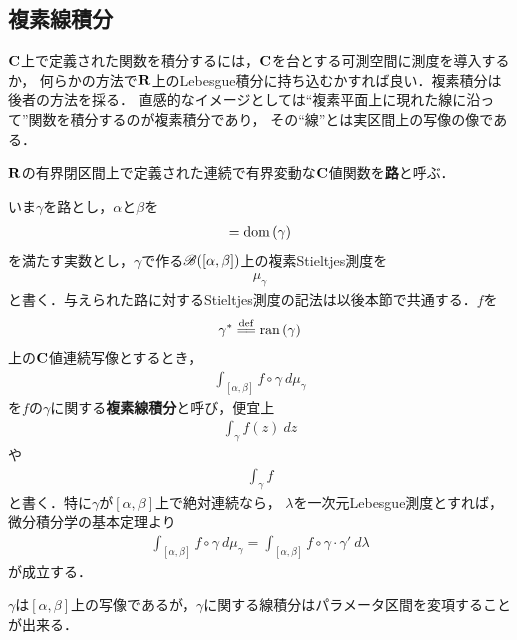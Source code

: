 \subsection{複素線積分}
	
	$\mathbf{C}$上で定義された関数を積分するには，$\mathbf{C}$を台とする可測空間に測度を導入するか，
	何らかの方法で$\mathbf{R}$上のLebesgue積分に持ち込むかすれば良い．複素積分は後者の方法を採る．
	直感的なイメージとしては``複素平面上に現れた線に沿って''関数を積分するのが複素積分であり，
	その``線''とは実区間上の写像の像である．
	
	\begin{screen}
		\begin{dfn}[路]
			$\mathbf{R}$の有界閉区間上で定義された連続で有界変動な$\mathbf{C}$値関数を{\bf 路}と呼ぶ．
		\end{dfn}
	\end{screen}
	
	いま$\gamma$を路とし，$\alpha$と$\beta$を
	\begin{align}
		[\alpha,\beta] = \dom{\gamma}
	\end{align}
	を満たす実数とし，$\gamma$で作る$\mathscr{B}([\alpha,\beta])$上の複素Stieltjes測度を
	\begin{align}
		\mu_{\gamma}
	\end{align}
	と書く．与えられた路に対するStieltjes測度の記法は以後本節で共通する．$f$を
	\begin{align}
		\gamma^* \defeq \ran{\gamma}
	\end{align}
	上の$\mathbf{C}$値連続写像とするとき，
	\begin{align}
		\int_{[\alpha,\beta]} f \circ \gamma\ d\mu_{\gamma}
	\end{align}
	を$f$の$\gamma$に関する{\bf 複素線積分}と呼び，便宜上
	\begin{align}
		\int_{\gamma} f(z)\ dz
	\end{align}
	や
	\begin{align}
		\int_{\gamma} f
	\end{align}
	と書く．特に$\gamma$が$[\alpha,\beta]$上で絶対連続なら，
	$\lambda$を一次元Lebesgue測度とすれば，微分積分学の基本定理より
	\begin{align}
		\int_{[\alpha,\beta]} f \circ \gamma\ d\mu_\gamma = \int_{[\alpha,\beta]}f \circ \gamma \cdot \gamma'\ d\lambda
	\end{align}
	が成立する．
	
	$\gamma$は$[\alpha,\beta]$上の写像であるが，$\gamma$に関する線積分はパラメータ区間を変項することが出来る．
	
